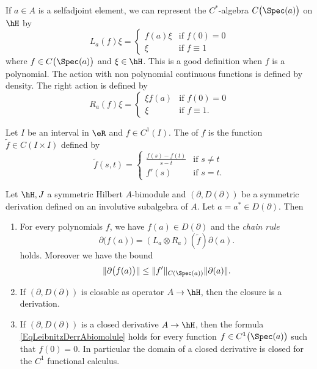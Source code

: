 If $a\in A$ is a selfadjoint element, we can represent the $C^*$-algebra $C\big( \Spec(a) \big)$ on $\hH$ by
\begin{equation}
	L_a(f)\xi=\begin{cases}
		f(a)\xi	&	\text{if }f(0)=0\\
		\xi	&	 \text{if }f\equiv 1
	\end{cases}
\end{equation}
where $f\in C\big( \Spec(a) \big)$ and $\xi\in\hH$. This is a good definition when $f$ is a polynomial. The action with non polynomial continuous functions is defined by density. The right action is defined by
\begin{equation}
	R_a(f)\xi=\begin{cases}
		\xi f(a)	&	\text{if }f(0)=0\\
		\xi	&	 \text{if }f\equiv 1.
	\end{cases}
\end{equation}

Let \(I\) be an interval in \(\eR\) and \(f\in C^1(I)\). The  of \(f\) is the function \(\tilde f\in C(I\times I)\) defined by
\begin{equation}
    \tilde f(s,t)=\begin{cases}
        \frac{ f(s)-f(t) }{ s-t }    &   \text{if }s\neq t\\
        f'(s)    &    \text{if }s=t.
    \end{cases}
\end{equation}

\begin{lemma}
    Let \(\hH,J\) a symmetric Hilbert \(A\)-bimodule and \( (\partial,D(\partial))\) be a symmetric derivation defined on an involutive subalgebra of \(A\). Let \(a=a^*\in D(\partial)\). Then
    \begin{enumerate}
        \item
            For every polynomials \(f\), we have \(f(a)\in D(\partial)\) and the \emph{chain rule}
            \begin{equation}        \label{EqLeibnitzDerrAbiomolule}
                \partial\big( f(a) \big)=(L_a\otimes R_a)(\tilde f)\partial(a).
            \end{equation}
            holds. Moreover we have the bound
            \begin{equation}        \label{EqBoundpartialfanfpnpa}
                \| \partial\big( f(a) \big) \|\leq \| f' \|_{C(\Spec(a))}\| \partial(a) \|.
            \end{equation}
        \item
            If \( (\partial,D(\partial))\) is closable as operator \(A\to\hH\), then the closure is a derivation.
        \item
            If \( (\partial,D(\partial))\) is a closed derivative \(A\to\hH\), then the formula \eqref{EqLeibnitzDerrAbiomolule} holds for every function \(f\in C^1\big( \Spec(a) \big)\) such that \(f(0)=0\). In particular the domain of a closed derivative is closed for the \(C^1\) functional calculus.
    \end{enumerate}
    
\end{lemma}

